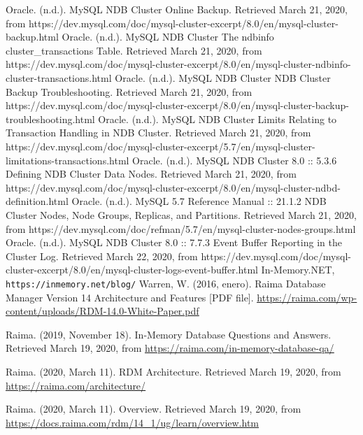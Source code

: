 \documentclass{acmart}
\begin{document}
\begin{thebibliography}{99}
	 Oracle. (n.d.). MySQL NDB Cluster Online Backup. Retrieved March 21, 2020, from https://dev.mysql.com/doc/mysql-cluster-excerpt/8.0/en/mysql-cluster-backup.html
	 Oracle. (n.d.). MySQL NDB Cluster The ndbinfo cluster\_transactions Table. Retrieved March 21, 2020, from https://dev.mysql.com/doc/mysql-cluster-excerpt/8.0/en/mysql-cluster-ndbinfo-cluster-transactions.html
	 Oracle. (n.d.). MySQL NDB Cluster NDB Cluster Backup Troubleshooting. Retrieved March 21, 2020, from https://dev.mysql.com/doc/mysql-cluster-excerpt/8.0/en/mysql-cluster-backup-troubleshooting.html
	 Oracle. (n.d.). MySQL NDB Cluster Limits Relating to Transaction Handling in NDB Cluster. Retrieved March 21, 2020, from https://dev.mysql.com/doc/mysql-cluster-excerpt/5.7/en/mysql-cluster-limitations-transactions.html
	 Oracle. (n.d.). MySQL NDB Cluster 8.0 :: 5.3.6 Defining NDB Cluster Data Nodes. Retrieved March 21, 2020, from https://dev.mysql.com/doc/mysql-cluster-excerpt/8.0/en/mysql-cluster-ndbd-definition.html
	 Oracle. (n.d.). MySQL 5.7 Reference Manual :: 21.1.2 NDB Cluster Nodes, Node Groups, Replicas, and Partitions. Retrieved March 21, 2020, from https://dev.mysql.com/doc/refman/5.7/en/mysql-cluster-nodes-groups.html
	 Oracle. (n.d.). MySQL NDB Cluster 8.0 :: 7.7.3 Event Buffer Reporting in the Cluster Log. Retrieved March 22, 2020, from https://dev.mysql.com/doc/mysql-cluster-excerpt/8.0/en/mysql-cluster-logs-event-buffer.html
	In-Memory.NET,
    \\\texttt{https://inmemory.net/blog/}
     Warren, W. (2016, enero). Raima Database Manager Version 14 Architecture and Features [PDF file]. \href{https://raima.com/wp-content/uploads/RDM-14.0-White-Paper.pdf}{\ul{https://raima.com/wp-content/uploads/RDM-14.0-White-Paper.pdf}}\par
	 Raima. (2019, November 18). In-Memory Database Questions and Answers. Retrieved March 19, 2020, from \href{https://raima.com/in-memory-database-qa/}{\ul{https://raima.com/in-memory-database-qa/}} \par
	 Raima. (2020, March 11). RDM Architecture. Retrieved March 19, 2020, from \href{https://raima.com/architecture/}{\ul{https://raima.com/architecture/}} \par
	 Raima. (2020, March 11). Overview. Retrieved March 19, 2020, from \href{https://docs.raima.com/rdm/14_1/ug/learn/overview.htm}{\ul{https://docs.raima.com/rdm/14\_1/ug/learn/overview.htm}} \par

\end{thebibliography}
\end{document}
